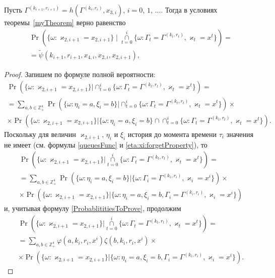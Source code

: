 \begin{corollary}
Пусть $\Gamma^{(k_{i+1},  r_{i+1})}=h(\Gamma^{(k_i,  r_i)},  x_{3,  i})$,   $i=0$,   $1$,   $\ldots$. Тогда в условиях теоремы~\ref{myTheorem} верно равенство
\begin{multline}
\Pr (\{ \omega \colon \varkappa_{2,  i+1} = x_{2,  i+1}\} \mid\mathop{\cap}\limits_{t=0}^{i}\{\omega\colon \Gamma_t=\Gamma^{(k_t,  r_t)},   \varkappa_t=x^t\})=\\=\widetilde{\psi}(k_{i+1},  r_{i+1},  x_{4,  i},  x_{2,  i},  x_{2,  i+1}),  
\label{kappa:2:conditional}
\end{multline}
\end{corollary}
\begin{proof}
Запишем по формуле полной вероятности:
\begin{multline*}
\Pr (\{ \omega \colon \varkappa_{2,  i+1} = x_{2,  i+1}\} |\cap_{t=0}^{i}\{\omega\colon \Gamma_t=\Gamma^{(k_t,  r_t)},   \varkappa_t=x^t\}) = \\
= \sum_{a,  b\in \mathbb{Z}_+^4} \Pr (\{ \omega \colon \eta_i=a,   \xi_i=b\} |\cap_{t=0}^{i}\{\omega\colon \Gamma_t=\Gamma^{(k_t,  r_t)},   \varkappa_t=x^t\}) \times \\
\times \Pr (\{ \omega \colon \varkappa_{2,  i+1} = x_{2,  i+1}\} |\{\omega\colon \eta_i=a,   \xi_i=b\}\cap \cap_{t=0}^{i}\{\omega\colon \Gamma_t=\Gamma^{(k_t,  r_t)},   \varkappa_t=x^t\}).
\end{multline*}
Поскольку для величин $\varkappa_{2,  i+1}$,  $\eta_i$ и $\xi_i$ история до момента времени $\tau_i$ значения не имеет (см. формулы \eqref{queuesFunc} и \eqref{eta:xi:forgetProperty}),  то
\begin{multline*}
\Pr (\{ \omega \colon \varkappa_{2,  i+1} = x_{2,  i+1}\} |\mathop{\cap}\limits_{t=0}^{i}\{\omega\colon \Gamma_t=\Gamma^{(k_t,  r_t)},   \varkappa_t=x^t\}) = \\
=\sum_{a,  b\in \mathbb{Z}_+^4} \Pr (\{ \omega \colon \eta_i=a,   \xi_i=b\} |\{\omega\colon \Gamma_i=\Gamma^{(k_i,  r_i)},   \varkappa_i=x^i\}) \times \\
\times \Pr (\{ \omega \colon \varkappa_{2,  i+1} = x_{2,  i+1}\} |\{\omega\colon \eta_i=a,   \xi_i=b,   \Gamma_i=\Gamma^{(k_i,  r_i)},   \varkappa_i=x^i\}) 
\end{multline*}
и,   учитывая формулу \eqref{ProbablititiesToProve},   продолжим
\begin{multline*}
\Pr (\{ \omega \colon \varkappa_{2,  i+1} = x_{2,  i+1}\} |\mathop{\cap}\limits_{t=0}^{i}\{\omega\colon \Gamma_t=\Gamma^{(k_t,  r_t)},   \varkappa_t=x^t\}) =\\
=\sum_{a,  b\in \mathbb{Z}_+^4} \varphi(a,  k_i,  r_i,  x^i)\zeta(b,  k_i,  r_i,  x^i) \times\\
\times \Pr (\{ \omega \colon \varkappa_{2,  i+1} = x_{2,  i+1}\} |\{\omega\colon \eta_i=a,   \xi_i=b,   \Gamma_i=\Gamma^{(k_i,  r_i)},   \varkappa_i=x^i\}).
\end{multline*}


\end{proof}
